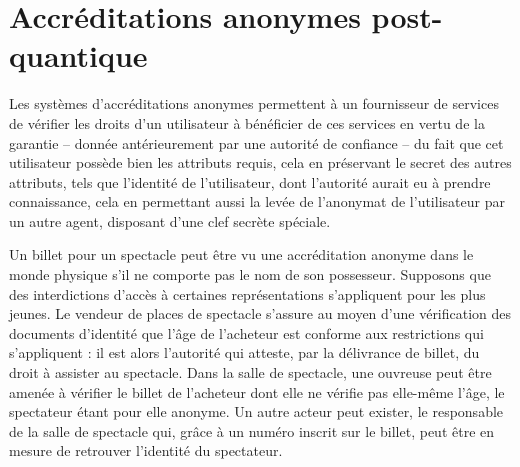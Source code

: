 
\section{Accréditations anonymes post-quantique} %

Les systèmes d’accréditations anonymes permettent à un fournisseur de services de vérifier les droits d’un utilisateur à bénéficier de ces services en vertu de la garantie – donnée antérieurement par une autorité de confiance – du fait que cet utilisateur possède bien les attributs requis, cela en préservant le secret des autres attributs, tels que l’identité de l’utilisateur, dont l’autorité aurait eu à prendre connaissance, cela en permettant aussi la levée de l’anonymat de l’utilisateur par un autre agent, disposant d’une clef secrète spéciale.

Un billet pour un spectacle peut être vu une accréditation anonyme dans le monde physique s’il ne
comporte pas le nom de son possesseur.
Supposons que des interdictions d’accès à certaines représentations s’appliquent pour les plus
jeunes.
Le vendeur de places de spectacle s’assure au moyen d’une vérification des documents d’identité que
l’âge de l’acheteur est conforme aux restrictions qui s’appliquent : il est alors l’autorité qui
atteste, par la délivrance de billet, du droit à assister au spectacle.
Dans la salle de spectacle, une ouvreuse peut être amenée à vérifier le billet de l’acheteur dont
elle ne vérifie pas elle-même l’âge, le spectateur étant pour elle anonyme.
Un autre acteur peut exister, le responsable de la salle de spectacle qui, grâce à un numéro inscrit
sur le billet, peut être en mesure de retrouver l’identité du spectateur.

